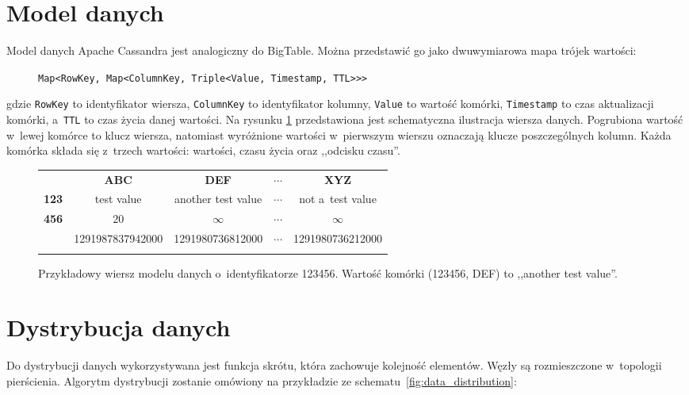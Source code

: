 \section{Model danych}
\label{sec:cassandra_data_model}

Model danych Apache Cassandra jest analogiczny do BigTable. \cite{official_bigtable} Można przedstawić go jako dwuwymiarowa mapa trójek wartości:

\begin{figure}[ht!]
	\centering
	\verb+Map<RowKey, Map<ColumnKey, Triple<Value, Timestamp, TTL>>>+
\end{figure}

gdzie \verb+RowKey+ to identyfikator wiersza, \verb+ColumnKey+ to identyfikator kolumny, \verb+Value+ to wartość komórki, \verb+Timestamp+ to czas aktualizacji komórki, a~\verb+TTL+ to czas życia danej wartości. \cite{mc_fadin_long_live_data_model} Na rysunku \ref{fig:data_model_example} przedstawiona jest schematyczna ilustracja wiersza danych. Pogrubiona wartość w~lewej komórce to klucz wiersza, natomiast wyróżnione wartości w~pierwszym wierszu oznaczają klucze poszczególnych kolumn. Każda komórka składa się z~trzech wartości: wartości, czasu życia oraz ,,odcisku czasu''.

\begin{figure}[ht!]
	\centering
	\begin{tabular}{|l||c|c|c|c|}
		\hhline{|-||----|}
		& \textbf{ABC} & \textbf{DEF} & $\cdots$ & \textbf{XYZ} \\
		\hhline{|~||====|}
		\textbf{123} & test value & another test value & $\cdots$ & not a~test value \\
		\cline{2-5}
		\textbf{456} & $20$ & $\infty$ & $\cdots$ & $\infty$ \\
		\cline{2-5}
		& 1291987837942000 & 1291980736812000 & $\cdots$ & 1291980736212000 \\
		\hhline{|-||----|}
	\end{tabular}

	\caption{Przykładowy wiersz modelu danych o~identyfikatorze 123456. Wartość komórki (123456, DEF) to ,,another test value''.}
	\label{fig:data_model_example}
\end{figure}

\section{Dystrybucja danych}
\label{sec:cassandra_data_distribution}

Do dystrybucji danych wykorzystywana jest funkcja skrótu, która zachowuje kolejność elementów. Węzły są rozmieszczone w~topologii pierścienia. Algorytm dystrybucji zostanie omówiony na przykładzie ze schematu~\ref{fig:data_distribution}: 

